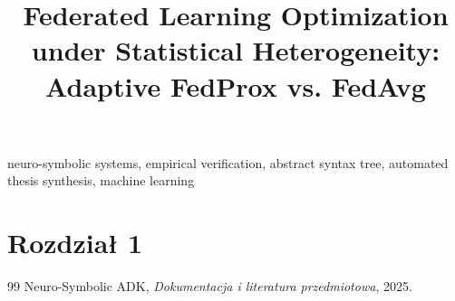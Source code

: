 \documentclass[conference]{IEEEtran}
\begin{document}
\title{Federated Learning Optimization under Statistical Heterogeneity: Adaptive FedProx vs. FedAvg}

\author{
}


\thispagestyle{plain}

\begin{abstract}

\end{abstract}

\begin{IEEEkeywords}
neuro-symbolic systems, empirical verification, abstract syntax tree, automated thesis synthesis, machine learning
\end{IEEEkeywords}

\section{Rozdział 1}



\begin{thebibliography}{99}
   Neuro-Symbolic ADK, \textit{Dokumentacja i literatura przedmiotowa}, 2025.
\end{thebibliography}
\end{document}

